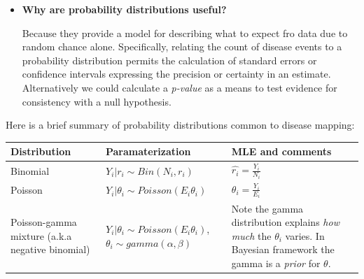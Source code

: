 \documentclass[
]{book}
\newenvironment{rmdblock}[1]
  {%
  \begin{itemize}
  \renewcommand{\labelitemi}{
    \raisebox{-.7\height}[0pt][0pt]{
      {\setkeys{Gin}{width=3em,keepaspectratio}\texttt{[image: images/\#1]}}
    }
  }
  \item
  }
  {
  \end{itemize}
  }
\newenvironment{rmdnote}
  {\begin{rmdblock}{note}}
  {\end{rmdblock}}
\begin{document}
\begin{rmdnote}
\textbf{Why are probability distributions useful?}

Because they provide a model for describing what to expect fro data due to random chance alone. Specifically, relating the count of disease events to a probability distribution permits the calculation of standard errors or confidence intervals expressing the precision or certainty in an estimate. Alternatively we could calculate a \emph{p-value} as a means to test evidence for consistency with a null hypothesis.
\end{rmdnote}

Here is a brief summary of probability distributions common to disease mapping:

\begin{longtable}[]{@{}lll@{}}
\toprule
\begin{minipage}[b]{0.19\columnwidth}\raggedright
Distribution\strut
\end{minipage} & \begin{minipage}[b]{0.31\columnwidth}\raggedright
Paramaterization\strut
\end{minipage} & \begin{minipage}[b]{0.40\columnwidth}\raggedright
MLE and comments\strut
\end{minipage}\tabularnewline
\midrule
\endhead
\begin{minipage}[t]{0.19\columnwidth}\raggedright
Binomial\strut
\end{minipage} & \begin{minipage}[t]{0.31\columnwidth}\raggedright
\(Y_i|r_i\sim Bin(N_i,r_i)\)\strut
\end{minipage} & \begin{minipage}[t]{0.40\columnwidth}\raggedright
\(\hat{r_i}=\frac{Y_i}{N_i}\)\strut
\end{minipage}\tabularnewline
\begin{minipage}[t]{0.19\columnwidth}\raggedright
Poisson\strut
\end{minipage} & \begin{minipage}[t]{0.31\columnwidth}\raggedright
\(Y_i|\theta_i\sim Poisson(E_i\theta_i)\)\strut
\end{minipage} & \begin{minipage}[t]{0.40\columnwidth}\raggedright
\(\theta_i = \frac{Y_i}{E_i}\)\strut
\end{minipage}\tabularnewline
\begin{minipage}[t]{0.19\columnwidth}\raggedright
Poisson-gamma mixture (a.k.a negative binomial)\strut
\end{minipage} & \begin{minipage}[t]{0.31\columnwidth}\raggedright
\(Y_i|\theta_i\sim Poisson(E_i\theta_i)\), \(\theta_i \sim gamma(\alpha, \beta)\)\strut
\end{minipage} & \begin{minipage}[t]{0.40\columnwidth}\raggedright
Note the gamma distribution explains \emph{how much} the \(\theta_i\) varies. In Bayesian framework the gamma is a \emph{prior} for \(\theta\).\strut
\end{minipage}\tabularnewline
\bottomrule
\end{longtable}
\end{document}
